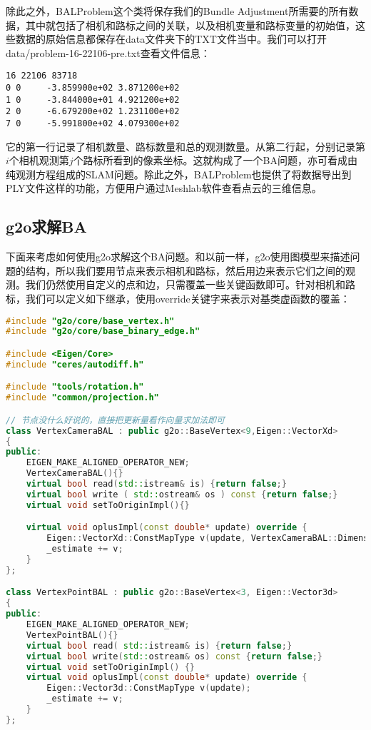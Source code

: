除此之外，BALProblem这个类将保存我们的Bundle Adjustment所需要的所有数据，其中就包括了相机和路标之间的关联，以及相机变量和路标变量的初始值，这些数据的原始信息都保存在data文件夹下的TXT文件当中。我们可以打开data/problem-16-22106-pre.txt查看文件信息：

\clearpage
\begin{lstlisting}
16 22106 83718
0 0     -3.859900e+02 3.871200e+02
1 0     -3.844000e+01 4.921200e+02
2 0     -6.679200e+02 1.231100e+02
7 0     -5.991800e+02 4.079300e+02
\end{lstlisting}

它的第一行记录了相机数量、路标数量和总的观测数量。从第二行起，分别记录第$i$个相机观测第$j$个路标所看到的像素坐标。这就构成了一个BA问题，亦可看成由纯观测方程组成的SLAM问题。除此之外，BALProblem也提供了将数据导出到PLY文件这样的功能，方便用户通过Meshlab软件查看点云的三维信息。

\subsection{g2o求解BA}
下面来考虑如何使用g2o求解这个BA问题。和以前一样，g2o使用图模型来描述问题的结构，所以我们要用节点来表示相机和路标，然后用边来表示它们之间的观测。我们仍然使用自定义的点和边，只需覆盖一些关键函数即可。针对相机和路标，我们可以定义如下继承，使用override关键字来表示对基类虚函数的覆盖：

\begin{lstlisting}[language=c++,caption=slambook/ch10/g2o_custombundle/g2o_bal_class.h]
#include "g2o/core/base_vertex.h"
#include "g2o/core/base_binary_edge.h"

#include <Eigen/Core>
#include "ceres/autodiff.h"

#include "tools/rotation.h"
#include "common/projection.h"

// 节点没什么好说的，直接把更新量看作向量求加法即可
class VertexCameraBAL : public g2o::BaseVertex<9,Eigen::VectorXd>
{
public:
	EIGEN_MAKE_ALIGNED_OPERATOR_NEW;
	VertexCameraBAL(){}
	virtual bool read(std::istream& is) {return false;}       
	virtual bool write ( std::ostream& os ) const {return false;}
	virtual void setToOriginImpl(){}

	virtual void oplusImpl(const double* update) override {
		Eigen::VectorXd::ConstMapType v(update, VertexCameraBAL::Dimension);
		_estimate += v;
	}	
};

class VertexPointBAL : public g2o::BaseVertex<3, Eigen::Vector3d>
{
public:
	EIGEN_MAKE_ALIGNED_OPERATOR_NEW;
	VertexPointBAL(){}
	virtual bool read( std::istream& is) {return false;}
	virtual bool write(std::ostream& os) const {return false;}
	virtual void setToOriginImpl() {}
	virtual void oplusImpl(const double* update) override {
		Eigen::Vector3d::ConstMapType v(update);
		_estimate += v;
	}
};
\end{lstlisting}

